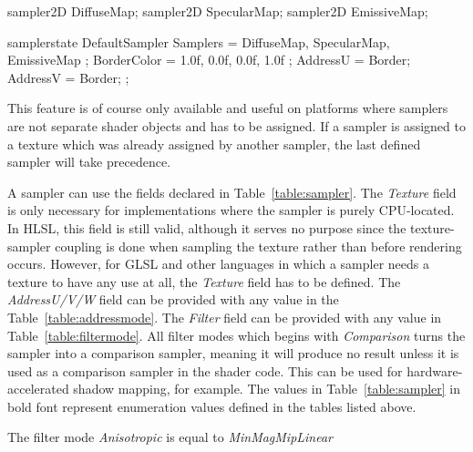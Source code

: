 \documentclass{article}
\begin{document}
\begin{CodeBox}
sampler2D DiffuseMap;
sampler2D SpecularMap;
sampler2D EmissiveMap;

samplerstate DefaultSampler
{
	Samplers = { DiffuseMap, SpecularMap, EmissiveMap }; 
	BorderColor = { 1.0f, 0.0f, 0.0f, 1.0f };
	AddressU = Border;
	AddressV = Border;
};
\end{CodeBox}

This feature is of course only available and useful on platforms where samplers are not separate shader objects and has to be assigned. If a sampler is assigned to a texture which was already assigned by another sampler, the last defined sampler will take precedence. 

A sampler can use the fields declared in Table~\ref{table:sampler}. The \textit{Texture} field is only necessary for implementations where the sampler is purely CPU-located. In HLSL, this field is still valid, although it serves no purpose since the texture-sampler coupling is done when sampling the texture rather than before rendering occurs. However, for GLSL and other languages in which a sampler needs a texture to have any use at all, the \textit{Texture} field has to be defined. The \textit{AddressU/V/W} field can be provided with any value in the Table~\ref{table:addressmode}. The \textit{Filter} field can be provided with any value in Table~\ref{table:filtermode}. All filter modes which begins with \textit{Comparison} turns the sampler into a comparison sampler, meaning it will produce no result unless it is used as a comparison sampler in the shader code. This can be used for hardware-accelerated shadow mapping, for example. The values in Table~\ref{table:sampler} in bold font represent enumeration values defined in the tables listed above.

The filter mode \textit{Anisotropic} is equal to \textit{MinMagMipLinear}
\end{document}
